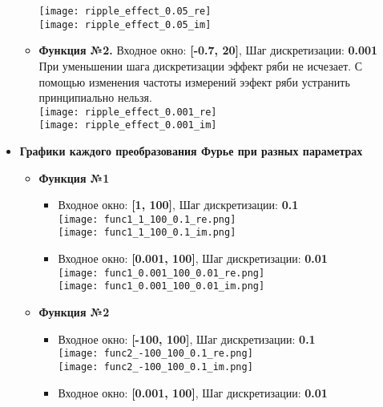 \documentclass[11pt]{article}
\begin{document}
\begin{itemize}
\begin{itemize}
			\texttt{[image: ripple\_effect\_0.05\_re]}\\
			\texttt{[image: ripple\_effect\_0.05\_im]}\\
		\item \textbf{Функция №2.} Входное окно: \textbf{[-0.7, 20]}, Шаг дискретизации: \textbf{0.001} \medskip \\
			При уменьшении шага дискретизации эффект ряби не исчезает. С помощью изменения частоты измерений ээфект ряби устранить принципиально нельзя. \bigskip \\
			\texttt{[image: ripple\_effect\_0.001\_re]}\\
			\texttt{[image: ripple\_effect\_0.001\_im]}\\
	\end{itemize} 
	\newpage
	\item \textbf{Графики каждого преобразования Фурье при разных параметрах}
	\begin{itemize}
		\item \textbf{Функция №1}
			\begin{itemize}	
				\item Входное окно: \textbf{[1, 100]}, Шаг дискретизации: \textbf{0.1} \medskip \\
					\texttt{[image: func1\_1\_100\_0.1\_re.png]}\\
					\texttt{[image: func1\_1\_100\_0.1\_im.png]}\\
				\item Входное окно: \textbf{[0.001, 100]}, Шаг дискретизации: \textbf{0.01} \medskip \\
					\texttt{[image: func1\_0.001\_100\_0.01\_re.png]}\\
					\texttt{[image: func1\_0.001\_100\_0.01\_im.png]}\\
			\end{itemize}
		\item \textbf{Функция №2}	
			\begin{itemize}
				\item Входное окно: \textbf{[-100, 100]}, Шаг дискретизации: \textbf{0.1} \medskip \\
					\texttt{[image: func2\_-100\_100\_0.1\_re.png]}\\
					\texttt{[image: func2\_-100\_100\_0.1\_im.png]}\\
				\item Входное окно: \textbf{[0.001, 100]}, Шаг дискретизации: \textbf{0.01} \medskip \\

\end{itemize}
\end{itemize}
\end{itemize}
\end{document}
